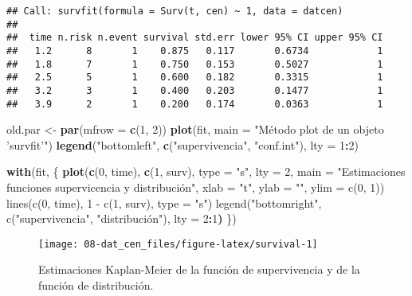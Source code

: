 \documentclass[
]{book}
\newenvironment{Shaded}{\begin{snugshade}}{\end{snugshade}}
\newcommand{\DataTypeTok}[1]{\textcolor[rgb]{0.13,0.29,0.53}{#1}}
\newcommand{\DecValTok}[1]{\textcolor[rgb]{0.00,0.00,0.81}{#1}}
\newcommand{\ErrorTok}[1]{\textcolor[rgb]{0.64,0.00,0.00}{\textbf{#1}}}
\newcommand{\KeywordTok}[1]{\textcolor[rgb]{0.13,0.29,0.53}{\textbf{#1}}}
\newcommand{\NormalTok}[1]{#1}
\newcommand{\OperatorTok}[1]{\textcolor[rgb]{0.81,0.36,0.00}{\textbf{#1}}}
\newcommand{\StringTok}[1]{\textcolor[rgb]{0.31,0.60,0.02}{#1}}
\theoremstyle{break}
\theoremstyle{definition}
\theoremstyle{definition}
\theoremstyle{definition}
\theoremstyle{remark}
\begin{document}
\begin{verbatim}
## Call: survfit(formula = Surv(t, cen) ~ 1, data = datcen)
## 
##  time n.risk n.event survival std.err lower 95% CI upper 95% CI
##   1.2      8       1    0.875   0.117       0.6734            1
##   1.8      7       1    0.750   0.153       0.5027            1
##   2.5      5       1    0.600   0.182       0.3315            1
##   3.2      3       1    0.400   0.203       0.1477            1
##   3.9      2       1    0.200   0.174       0.0363            1
\end{verbatim}

\begin{Shaded}
\begin{Highlighting}[]
\NormalTok{old.par <-}\StringTok{ }\KeywordTok{par}\NormalTok{(}\DataTypeTok{mfrow =} \KeywordTok{c}\NormalTok{(}\DecValTok{1}\NormalTok{, }\DecValTok{2}\NormalTok{))}
\KeywordTok{plot}\NormalTok{(fit, }\DataTypeTok{main =} \StringTok{"Método plot de un objeto 'survfit'"}\NormalTok{)}
\KeywordTok{legend}\NormalTok{(}\StringTok{"bottomleft"}\NormalTok{,  }\KeywordTok{c}\NormalTok{(}\StringTok{"supervivencia"}\NormalTok{, }\StringTok{"conf.int"}\NormalTok{), }\DataTypeTok{lty =} \DecValTok{1}\OperatorTok{:}\DecValTok{2}\NormalTok{)}

\KeywordTok{with}\NormalTok{(fit, \{}
  \KeywordTok{plot}\NormalTok{(}\KeywordTok{c}\NormalTok{(}\DecValTok{0}\NormalTok{, time), }\KeywordTok{c}\NormalTok{(}\DecValTok{1}\NormalTok{, surv), }\DataTypeTok{type =} \StringTok{"s"}\NormalTok{, }\DataTypeTok{lty =} \DecValTok{2}\NormalTok{,}
       \DataTypeTok{main =} \StringTok{"Estimaciones funciones supervicencia y distribución", }
\StringTok{       xlab = "}\NormalTok{t}\StringTok{", ylab = "", ylim = c(0, 1))}
\StringTok{  lines(c(0, time), 1 - c(1, surv), type = "}\NormalTok{s}\StringTok{")}
\StringTok{  legend("}\NormalTok{bottomright}\StringTok{",  c("}\NormalTok{supervivencia}\StringTok{", "}\NormalTok{distribución"), lty =}\StringTok{ }\DecValTok{2}\OperatorTok{:}\DecValTok{1}\ErrorTok{)}
\NormalTok{\})}
\end{Highlighting}
\end{Shaded}

\begin{figure}[!htb]

{\centering \texttt{[image: 08-dat\_cen\_files/figure-latex/survival-1]} 

}

\caption{Estimaciones Kaplan-Meier de la función de supervivencia y de la función de distribución.}\label{fig:survival}
\end{figure}
\end{document}
